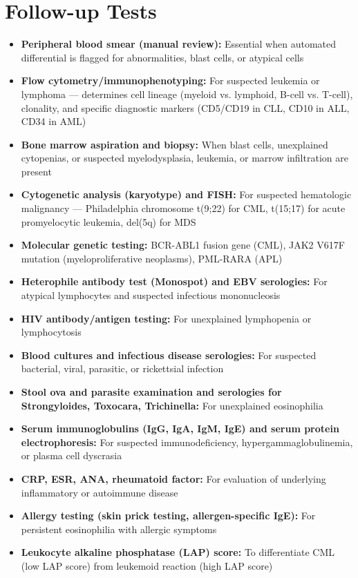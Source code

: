 \section*{Follow-up Tests}
\begin{itemize}
  \item \textbf{Peripheral blood smear (manual review):} Essential when automated differential is flagged for abnormalities, blast cells, or atypical cells
  \item \textbf{Flow cytometry/immunophenotyping:} For suspected leukemia or lymphoma --- determines cell lineage (myeloid vs. lymphoid, B-cell vs. T-cell), clonality, and specific diagnostic markers (CD5/CD19 in CLL, CD10 in ALL, CD34 in AML)
  \item \textbf{Bone marrow aspiration and biopsy:} When blast cells, unexplained cytopenias, or suspected myelodysplasia, leukemia, or marrow infiltration are present
  \item \textbf{Cytogenetic analysis (karyotype) and FISH:} For suspected hematologic malignancy --- Philadelphia chromosome t(9;22) for CML, t(15;17) for acute promyelocytic leukemia, del(5q) for MDS
  \item \textbf{Molecular genetic testing:} BCR-ABL1 fusion gene (CML), JAK2 V617F mutation (myeloproliferative neoplasms), PML-RARA (APL)
  \item \textbf{Heterophile antibody test (Monospot) and EBV serologies:} For atypical lymphocytes and suspected infectious mononucleosis
  \item \textbf{HIV antibody/antigen testing:} For unexplained lymphopenia or lymphocytosis
  \item \textbf{Blood cultures and infectious disease serologies:} For suspected bacterial, viral, parasitic, or rickettsial infection
  \item \textbf{Stool ova and parasite examination and serologies for Strongyloides, Toxocara, Trichinella:} For unexplained eosinophilia
  \item \textbf{Serum immunoglobulins (IgG, IgA, IgM, IgE) and serum protein electrophoresis:} For suspected immunodeficiency, hypergammaglobulinemia, or plasma cell dyscrasia
  \item \textbf{CRP, ESR, ANA, rheumatoid factor:} For evaluation of underlying inflammatory or autoimmune disease
  \item \textbf{Allergy testing (skin prick testing, allergen-specific IgE):} For persistent eosinophilia with allergic symptoms
  \item \textbf{Leukocyte alkaline phosphatase (LAP) score:} To differentiate CML (low LAP score) from leukemoid reaction (high LAP score)
\end{itemize}

